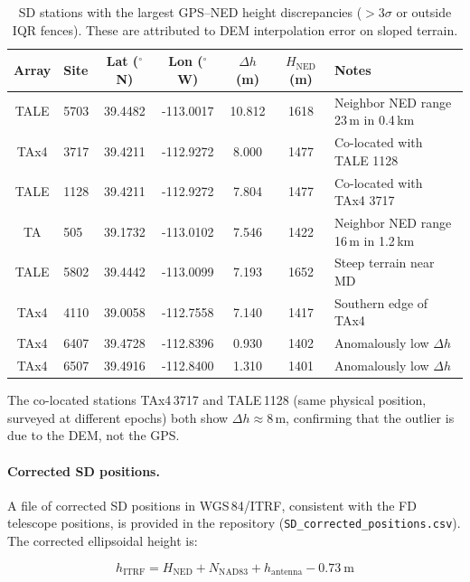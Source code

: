 \documentclass[11pt,letterpaper]{article}
\newcommand{\degree}{^\circ}
\begin{document}
\begin{table}[H]
\centering
\caption{SD stations with the largest GPS--NED height discrepancies ($>3\sigma$ or outside IQR fences). These are attributed to DEM interpolation error on sloped terrain.}
\label{tab:sd_outliers}
\smallskip
\footnotesize
\begin{tabular}{@{}clS[table-format=2.4]S[table-format=-3.4]S[table-format=2.3]S[table-format=4.0]l@{}}
\toprule
{Array} & {Site} & {Lat ($\degree$N)} & {Lon ($\degree$W)} & {$\Delta h$ (m)} & {$H_{\text{NED}}$ (m)} & {Notes} \\
\midrule
TALE & 5703 & 39.4482 & -113.0017 & 10.812 & 1618 & Neighbor NED range 23\,m in 0.4\,km \\
TAx4 & 3717 & 39.4211 & -112.9272 & 8.000  & 1477 & Co-located with TALE 1128 \\
TALE & 1128 & 39.4211 & -112.9272 & 7.804  & 1477 & Co-located with TAx4 3717 \\
TA   &  505 & 39.1732 & -113.0102 & 7.546  & 1422 & Neighbor NED range 16\,m in 1.2\,km \\
TALE & 5802 & 39.4442 & -113.0099 & 7.193  & 1652 & Steep terrain near MD \\
TAx4 & 4110 & 39.0058 & -112.7558 & 7.140  & 1417 & Southern edge of TAx4 \\
\addlinespace
TAx4 & 6407 & 39.4728 & -112.8396 & 0.930  & 1402 & Anomalously low $\Delta h$ \\
TAx4 & 6507 & 39.4916 & -112.8400 & 1.310  & 1401 & Anomalously low $\Delta h$ \\
\bottomrule
\end{tabular}
\end{table}

\noindent The co-located stations TAx4\,3717 and TALE\,1128 (same physical position, surveyed at different epochs) both show $\Delta h \approx 8$\,m, confirming that the outlier is due to the DEM, not the GPS.

\paragraph{Corrected SD positions.} A file of corrected SD positions in WGS\,84/ITRF, consistent with the FD telescope positions, is provided in the repository (\texttt{SD\_corrected\_positions.csv}). The corrected ellipsoidal height is:

\begin{equation}
h_{\text{ITRF}} = H_{\text{NED}} + N_{\text{NAD83}} + h_{\text{antenna}} - 0.73~\text{m}
\label{eq:sd_corrected}
\end{equation}
\end{document}

